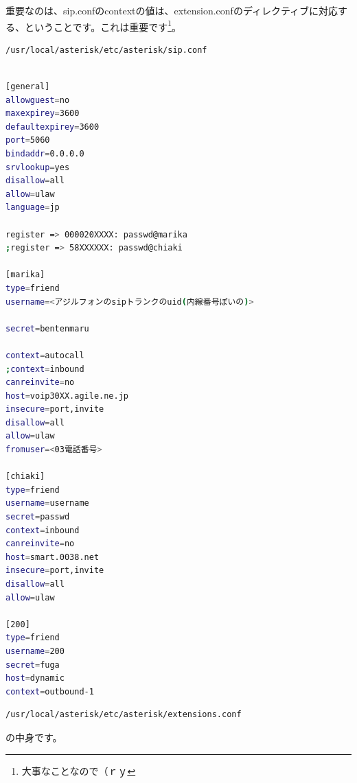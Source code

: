 重要なのは、sip.confのcontextの値は、extension.confのディレクティブに対応する、ということです。これは重要です\footnote{大事なことなので（ｒｙ}。

\begin{lstlisting}[language=bash]
/usr/local/asterisk/etc/asterisk/sip.conf
\end{lstlisting}

\begin{lstlisting}[language=bash]

[general]
allowguest=no
maxexpirey=3600
defaultexpirey=3600
port=5060
bindaddr=0.0.0.0
srvlookup=yes
disallow=all
allow=ulaw
language=jp

register => 000020XXXX: passwd@marika
;register => 58XXXXXX: passwd@chiaki

[marika]
type=friend
username=<アジルフォンのsipトランクのuid(内線番号ぽいの)>

secret=bentenmaru

context=autocall
;context=inbound
canreinvite=no
host=voip30XX.agile.ne.jp
insecure=port,invite
disallow=all
allow=ulaw
fromuser=<03電話番号>

[chiaki]
type=friend
username=username
secret=passwd
context=inbound
canreinvite=no
host=smart.0038.net
insecure=port,invite
disallow=all
allow=ulaw

[200]
type=friend
username=200
secret=fuga
host=dynamic
context=outbound-1
\end{lstlisting}


\begin{lstlisting}[language=bash]
/usr/local/asterisk/etc/asterisk/extensions.conf
\end{lstlisting}
の中身です。

